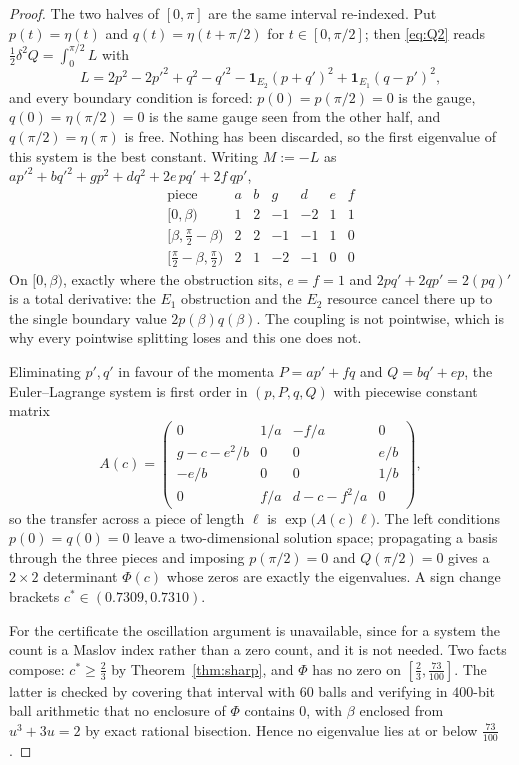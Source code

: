 \documentclass[11pt]{article}
\theoremstyle{definition}
\begin{document}
\begin{proof}
The two halves of $[0,\pi]$ are the same interval re-indexed. Put $p(t)=\eta(t)$ and
$q(t)=\eta(t+\pi/2)$ for $t\in[0,\pi/2]$; then \eqref{eq:Q2} reads
$\tfrac12\delta^2Q=\int_0^{\pi/2}L$ with
\[
  L=2p^2-2p'^2+q^2-q'^2-\mathbf 1_{E_2}(p+q')^2+\mathbf 1_{E_1}(q-p')^2 ,
\]
and every boundary condition is forced: $p(0)=p(\pi/2)=0$ is the gauge, $q(0)=\eta(\pi/2)=0$
is the same gauge seen from the other half, and $q(\pi/2)=\eta(\pi)$ is free. Nothing has
been discarded, so the first eigenvalue of this system is the best constant. Writing
$M:=-L$ as $a p'^2+b q'^2+g p^2+d q^2+2e\,pq'+2f\,qp'$,
\[
  \begin{array}{r|cccccc}
    \text{piece} & a & b & g & d & e & f\\\hline
    {[0,\beta)} & 1 & 2 & -1 & -2 & 1 & 1\\
    {[\beta,\tfrac\pi2-\beta)} & 2 & 2 & -1 & -1 & 1 & 0\\
    {[\tfrac\pi2-\beta,\tfrac\pi2)} & 2 & 1 & -2 & -1 & 0 & 0
  \end{array}
\]
On $[0,\beta)$, exactly where the obstruction sits, $e=f=1$ and
$2pq'+2qp'=2(pq)'$ is a total derivative: the $E_1$ obstruction and the $E_2$ resource
cancel there up to the single boundary value $2p(\beta)q(\beta)$. The coupling is not
pointwise, which is why every pointwise splitting loses and this one does not.

Eliminating $p',q'$ in favour of the momenta $P=ap'+fq$ and $Q=bq'+ep$, the
Euler--Lagrange system is first order in $(p,P,q,Q)$ with piecewise constant matrix
\[
  A(c)=\begin{pmatrix}
    0 & 1/a & -f/a & 0\\
    g-c-e^2/b & 0 & 0 & e/b\\
    -e/b & 0 & 0 & 1/b\\
    0 & f/a & d-c-f^2/a & 0
  \end{pmatrix},
\]
so the transfer across a piece of length $\ell$ is $\exp\bigl(A(c)\ell\bigr)$. The left
conditions $p(0)=q(0)=0$ leave a two-dimensional solution space; propagating a basis
through the three pieces and imposing $p(\pi/2)=0$ and $Q(\pi/2)=0$ gives a $2\times2$
determinant $\Phi(c)$ whose zeros are exactly the eigenvalues. A sign change brackets
$c^\ast\in(0.7309,0.7310)$.

For the certificate the oscillation argument is unavailable, since for a system the count is
a Maslov index rather than a zero count, and it is not needed. Two facts compose:
$c^\ast\ge\tfrac23$ by Theorem~\ref{thm:sharp}, and $\Phi$ has no zero on
$[\tfrac23,\tfrac{73}{100}]$. The latter is checked by covering that interval with $60$
balls and verifying in $400$-bit ball arithmetic that no enclosure of $\Phi$ contains $0$,
with $\beta$ enclosed from $u^3+3u=2$ by exact rational bisection. Hence no eigenvalue lies
at or below $\tfrac{73}{100}$.
\end{proof}
\end{document}
